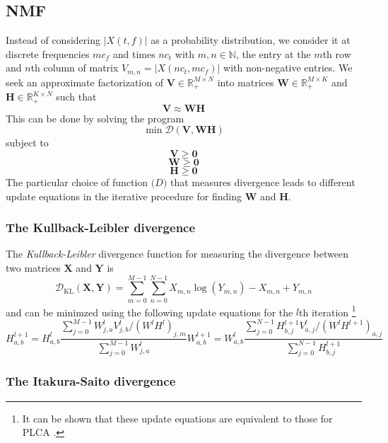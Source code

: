 \subsection{NMF}

Instead of considering $|X(t,f)|$ as a probability distribution, we
consider it at discrete frequencies $mc_{f}$ and times $nc_{t}$ with $m,n \in
\mathbb{N}$, the entry at the $m$th row and $n$th column of matrix
$V_{m,n}=|X(nc_{t},mc_{f})|$ with non-negative entries. We seek an
approximate factorization of $\boldsymbol{V} \in \mathbb{R}^{M \times N}_{+}$
into matrices $\boldsymbol{W} \in \mathbb{R}^{M \times K}_{+}$ and
$\boldsymbol{H} \in \mathbb{R}^{K \times N}_{+}$ such that
\begin{equation}
    \boldsymbol{V} \approx \boldsymbol{W}\boldsymbol{H}
    \label{eq:VaprxWH}
\end{equation}
This can be done by solving the program
\[
    \min \mathcal{D}(\boldsymbol{V},\boldsymbol{W}\boldsymbol{H})
\]
subject to
\[
    \boldsymbol{V} \geq \boldsymbol{0}
\]
\[
    \boldsymbol{W} \geq \boldsymbol{0}
\]
\[
    \boldsymbol{H} \geq \boldsymbol{0}
\]
The particular choice of function $\mathcal(D)$ that measures divergence leads
to different update equations in the iterative procedure for finding
$\boldsymbol{W}$ and $\boldsymbol{H}$.

\subsubsection{The Kullback-Leibler divergence \cite{lee2001algorithms}}

The \textit{Kullback-Leibler} divergence function for measuring the divergence
between two matrices $\boldsymbol{X}$ and $\boldsymbol{Y}$ is
\[
    \mathcal{D}_{\text{KL}}(\boldsymbol{X},\boldsymbol{Y}) =
    \sum_{m=0}^{M-1}\sum_{n=0}^{N-1} X_{m,n}\log(Y_{m,n})-X_{m,n}+Y_{m,n}
\]
and can be minimzed using the following update equations for the $l$th iteration%
\footnote{It can be shown that these update equations are equivalent to those for PLCA 
\cite{shashanka2008probabilistic}.}
\[
    H_{a,b}^{l+1} =
    H_{a,b}^{l} \frac{\sum_{j=0}^{M-1}W_{j,a}^{l}V_{j,b}^{l} / (W^{l}H^{l})_{j,m}}
    {\sum_{j=0}^{M-1}W_{j,a}^{l}}
    W_{a,b}^{l+1} =
    W_{a,b}^{l} \frac{\sum_{j=0}^{N-1}H_{b,j}^{l+1}V_{a,j}^{l} / (W^{l}H^{l+1})_{a,j}}
    {\sum_{j=0}^{N-1}H_{b,j}^{l+1}}
\]

\subsubsection{The Itakura-Saito divergence \cite{fevotte2009nonnegative}}

